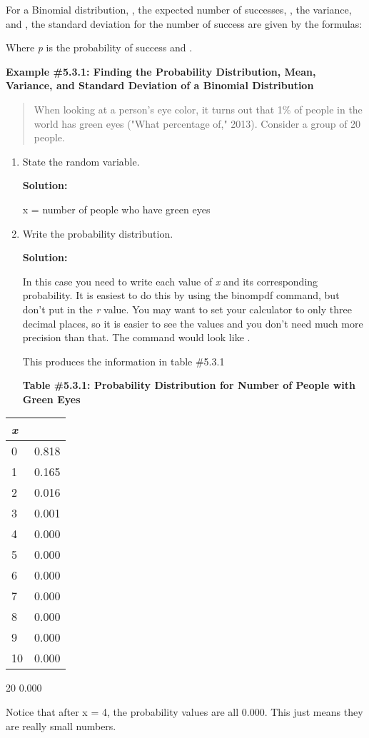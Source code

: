 \documentclass[]{book}
\begin{document}
For a Binomial distribution, , the expected number of successes, , the
variance, and , the standard deviation for the number of success are
given by the formulas:

Where \emph{p} is the probability of success and .

\textbf{Example \#5.3.1: Finding the Probability Distribution, Mean, Variance,
and Standard Deviation of a Binomial Distribution}

\begin{quote}
When looking at a person's eye color, it turns out that 1\% of people in the world has green eyes ("What percentage of," 2013). Consider a group of 20 people.
\end{quote}

\begin{enumerate}
\def\labelenumi{\alph{enumi}.}
\item
  State the random variable.

  \textbf{Solution:}

  x = number of people who have green eyes
\item
  Write the probability distribution.

  \textbf{Solution:}

  In this case you need to write each value of \emph{x} and its
  corresponding probability. It is easiest to do this by using the
  binompdf command, but don't put in the \emph{r} value. You may want to
  set your calculator to only three decimal places, so it is easier to
  see the values and you don't need much more precision than that. The
  command would look like .

  This produces the information in table \#5.3.1

  \textbf{Table \#5.3.1: Probability Distribution for Number of People with
  Green Eyes}
\end{enumerate}

\begin{longtable}[]{@{}ll@{}}
\toprule
\emph{x} &\tabularnewline
\midrule
\endhead
0 & 0.818\tabularnewline
1 & 0.165\tabularnewline
2 & 0.016\tabularnewline
3 & 0.001\tabularnewline
4 & 0.000\tabularnewline
5 & 0.000\tabularnewline
6 & 0.000\tabularnewline
7 & 0.000\tabularnewline
8 & 0.000\tabularnewline
9 & 0.000\tabularnewline
10 & 0.000\tabularnewline
\bottomrule
\end{longtable}

20 0.000

Notice that after x = 4, the probability values are all 0.000. This just
means they are really small numbers.
\end{document}
